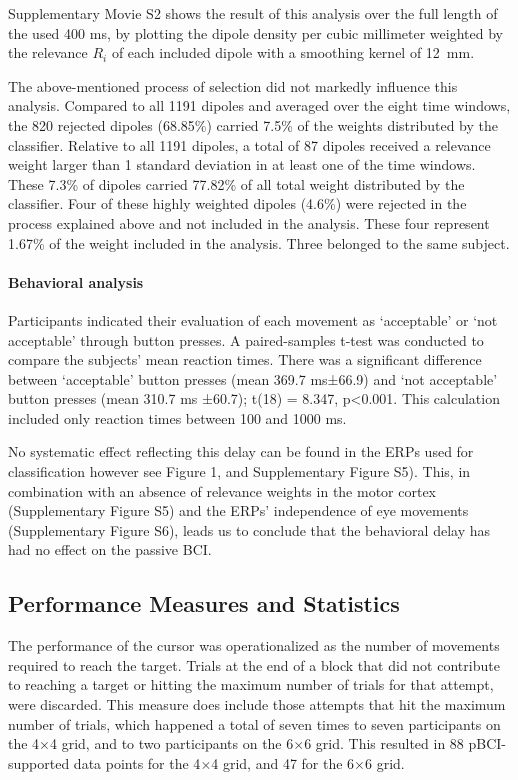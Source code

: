 Supplementary Movie S2 shows the result of this analysis over the full length of the used 400 ms, by plotting the dipole density per cubic millimeter weighted by the relevance $R_i$ of each included dipole with a smoothing kernel of 12~mm.

The above-mentioned process of selection did not markedly influence this analysis. Compared to all 1191 dipoles and averaged over the eight time windows, the 820 rejected dipoles (68.85\%) carried 7.5\% of the weights distributed by the classifier. Relative to all 1191 dipoles, a total of 87 dipoles received a relevance weight larger than 1 standard deviation in at least one of the time windows. These 7.3\% of dipoles carried 77.82\% of all total weight distributed by the classifier. Four of these highly weighted dipoles (4.6\%) were rejected in the process explained above and not included in the analysis. These four represent 1.67\% of the weight included in the analysis. Three belonged to the same subject.

\paragraph{Behavioral analysis}
Participants indicated their evaluation of each movement as `acceptable' or `not acceptable' through button presses. A paired-samples t-test was conducted to compare the subjects' mean reaction times. There was a significant difference between `acceptable' button presses (mean 369.7 ms±66.9) and `not acceptable' button presses (mean 310.7 ms ±60.7); t(18) = 8.347, p<0.001. This calculation included only reaction times between 100 and 1000 ms.

No systematic effect reflecting this delay can be found in the ERPs used for classification however see Figure 1, and Supplementary Figure S5). This, in combination with an absence of relevance weights in the motor cortex (Supplementary Figure S5) and the ERPs' independence of eye movements (Supplementary Figure S6), leads us to conclude that the behavioral delay has had no effect on the passive BCI.  


\subsection*{Performance Measures and Statistics}

The performance of the cursor was operationalized as the number of movements required to reach the target. Trials at the end of a block that did not contribute to reaching a target or hitting the maximum number of trials for that attempt, were discarded. This measure does include those attempts that hit the maximum number of trials, which happened a total of seven times to seven participants on the 4$\times$4 grid, and to two participants on the 6$\times$6 grid. This resulted in 88 pBCI-supported data points for the 4$\times$4 grid, and 47 for the 6$\times$6 grid. 

